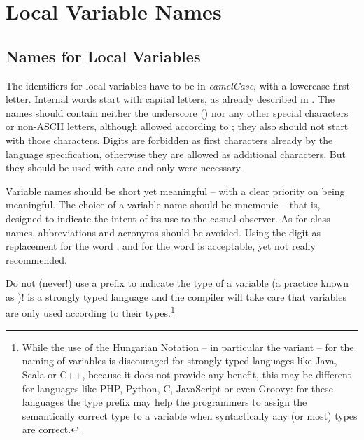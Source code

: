 \section{Local Variable Names}\label{sec:NamesForLocalVariables}
\subsection{Names for Local Variables}
The identifiers for local variables have to be in \textit{camelCase}, with a lowercase first letter. Internal words start with capital letters, as already described in . The names should contain neither the underscore (\bdq{\texttt{\_}}) nor any other special characters or non-ASCII letters, although allowed according to \jls \autocite{ORACLE_DOC_LANGUAGE_SPECIFICATION:Identifiers}; they also should not start with those characters. Digits are forbidden as first characters already by the language specification, otherwise they are allowed as additional characters. But they should be used with care and only were necessary.

Variable names should be short yet meaningful – with a clear priority on being meaningful. The choice of a variable name should be mnemonic – that is, designed to indicate the intent of its use to the casual observer. As for class names, abbreviations and acronyms should be avoided. Using the digit  as replacement for the word , and  for the word  is acceptable, yet not really recommended.

Do not (never!) use a prefix to indicate the type of a variable (a practice known as  \autocite{WIKIPEDIA:Hungarian_notation,Jack:HungarianNotation})! \Java is a strongly typed language and the compiler will take care that variables are only used according to their types.\footnote{While the use of the Hungarian Notation – in particular the  variant – for the naming of variables is discouraged for strongly typed languages like Java, Scala or \mbox{C++}, because it does not provide any benefit, this may be different for languages like PHP, Python, C, JavaScript or even Groovy: for these languages the type prefix may help the programmers to assign the semantically correct type to a variable when syntactically any (or most) types are correct.}

